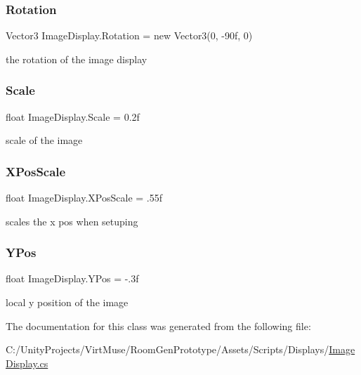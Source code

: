 \subsubsection{\texorpdfstring{Rotation}{Rotation}}
{\footnotesize\ttfamily Vector3 Image\+Display.\+Rotation = new Vector3(0, -\/90f, 0)\hspace{0.3cm}{\ttfamily [static]}}



the rotation of the image display 

\mbox{\label{class_image_display_aac7ba9a36c272ad5c6873119b521ed5e}} 
\subsubsection{\texorpdfstring{Scale}{Scale}}
{\footnotesize\ttfamily float Image\+Display.\+Scale = 0.\+2f\hspace{0.3cm}{\ttfamily [static]}}



scale of the image 

\mbox{\label{class_image_display_ae1044419b2f9dfa64d75329e48e312de}} 
\subsubsection{\texorpdfstring{X\+Pos\+Scale}{XPosScale}}
{\footnotesize\ttfamily float Image\+Display.\+X\+Pos\+Scale = .\+55f\hspace{0.3cm}{\ttfamily [static]}}



scales the x pos when setuping 

\mbox{\label{class_image_display_ac0ef458ef2e417549068a631e35f39d6}} 
\subsubsection{\texorpdfstring{Y\+Pos}{YPos}}
{\footnotesize\ttfamily float Image\+Display.\+Y\+Pos = -\/.\+3f\hspace{0.3cm}{\ttfamily [static]}}



local y position of the image 



The documentation for this class was generated from the following file\+:\begin{DoxyCompactItemize}
\item 
C\+:/\+Unity\+Projects/\+Virt\+Muse/\+Room\+Gen\+Prototype/\+Assets/\+Scripts/\+Displays/\mbox{\hyperlink{_image_display_8cs}{Image\+Display.\+cs}}\end{DoxyCompactItemize}
